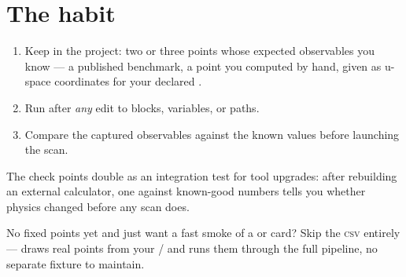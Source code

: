\section{The habit}
\label{sec:check-habit}

\begin{enumerate}
  \item Keep  in the project: two or three points whose
        expected observables you know --- a published benchmark, a point you computed
        by hand, given as u-space coordinates for your declared .
  \item Run  after \emph{any} edit to  blocks,
         variables, or  paths.
  \item Compare the captured observables against the known values before launching the
        scan.
\end{enumerate}

\begin{jtip}
The check points double as an integration test for tool upgrades: after rebuilding an
external calculator, one  against known-good numbers tells you
whether physics changed before any scan does.
\end{jtip}

\begin{jtip}
No fixed points yet and just want a fast smoke of a  or
 card? Skip the \textsc{csv} entirely ---  draws
 real points from your / and runs
them through the full pipeline, no separate fixture to maintain.
\end{jtip}
